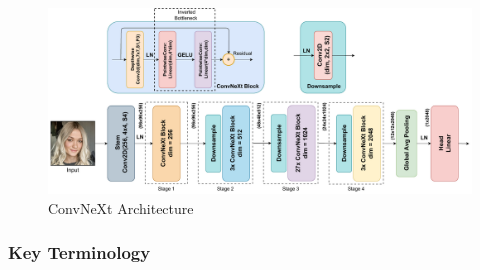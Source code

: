 \documentclass[a4paper,12pt,openright]{book}
\begin{document}
\begin{figure}[h]
\centering
\includegraphics[width=1.2\textwidth]{images/convok.drawio (1).pdf}
\caption{ConvNeXt Architecture}
\label{fig:convnext}
\end{figure}


\subsubsection{Key Terminology}
\end{document}
